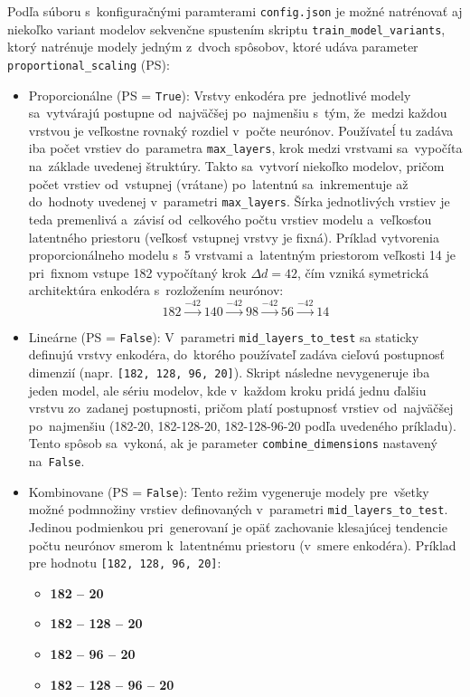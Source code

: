 Podľa súboru s~konfiguračnými paramterami \texttt{config.json} je možné natrénovať aj niekoľko variant modelov sekvenčne spustením skriptu \texttt{train\_model\_variants}, ktorý natrénuje modely jedným z~dvoch spôsobov, ktoré udáva parameter \texttt{proportional\_scaling} (PS):
\begin{itemize}
    \item Proporcionálne (PS = \texttt{True}):\label{imp:proportional} Vrstvy enkodéra pre~jednotlivé modely sa~vytvárajú postupne od~najväčšej po~najmenšiu s~tým, že~medzi každou vrstvou je veľkostne rovnaký rozdiel v~počte neurónov. Používateĺ tu zadáva iba počet vrstiev do~parametra \texttt{max\_layers}, krok medzi vrstvami sa~vypočíta na~základe uvedenej štruktúry. Takto sa~vytvorí niekoľko modelov, pričom počet vrstiev od~vstupnej (vrátane) po~latentnú sa~inkrementuje až do~hodnoty uvedenej v~parametri \texttt{max\_layers}. Šírka jednotlivých vrstiev je teda premenlivá a~závisí od~celkového počtu vrstiev modelu a~veľkosťou latentného priestoru (veľkosť vstupnej vrstvy je fixná). Príklad vytvorenia proporcionálneho modelu s~5 vrstvami a~latentným priestorom veľkosti 14 je pri~fixnom vstupe 182 vypočítaný krok $\Delta d = 42$, čím vzniká symetrická architektúra enkodéra s~rozložením neurónov:
    $$182 \xrightarrow{-42} 140 \xrightarrow{-42} 98 \xrightarrow{-42} 56 \xrightarrow{-42} 14$$
    \item Lineárne (PS = \texttt{False}):
    V~parametri \texttt{mid\_layers\_to\_test} sa staticky definujú vrstvy enkodéra, do~ktorého používateľ zadáva cieľovú postupnosť dimenzií (napr. \texttt{[182, 128, 96, 20]}). Skript následne nevygeneruje iba jeden model, ale sériu modelov, kde v~každom kroku pridá jednu ďalšiu vrstvu zo~zadanej postupnosti, pričom platí postupnosť vrstiev od~najväčšej po~najmenšiu (182-20, 182-128-20, 182-128-96-20 podľa uvedeného príkladu). Tento spôsob sa~vykoná, ak je parameter \texttt{combine\_dimensions} nastavený na~\texttt{False}.
    
    \item Kombinovane (PS = \texttt{False}): Tento režim vygeneruje modely pre~všetky možné podmnožiny vrstiev definovaných v~parametri \texttt{mid\_layers\_to\_test}. Jedinou podmienkou pri~generovaní je opäť zachovanie klesajúcej tendencie počtu neurónov smerom k~latentnému priestoru (v~smere enkodéra). Príklad pre hodnotu \texttt{[182, 128, 96, 20]}:
    \begin{itemize}[label=\tiny$\blacksquare$]
    \item \textbf{182 -- 20}
    \item \textbf{182 -- 128 -- 20}
    \item \textbf{182 -- 96 -- 20}
    \item \textbf{182 -- 128 -- 96 -- 20}
    \end{itemize}
\end{itemize}

